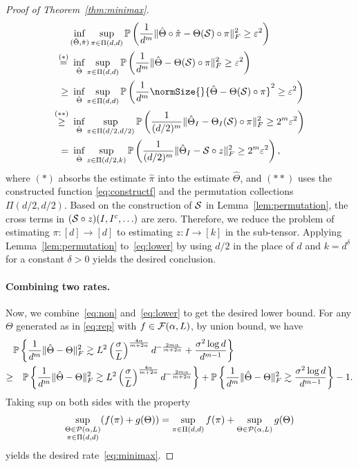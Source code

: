 \documentclass[12pt]{article}
\theoremstyle{definition}
\begin{document}
\begin{proof}[Proof of Theorem~\ref{thm:minimax}]
\begin{align}\label{eq:lower}
&\inf_{(\hat \Theta,\hat \pi)}\sup_{\pi\in \Pi(d,d)}\mathbb{P}\left({1\over d^m}\FnormSize{}{\hat \Theta\circ \hat \pi-\Theta(\tS)\circ \pi}^2\geq \varepsilon^2\right)\notag \\
\stackrel{(*)}{=}&\ \inf_{\hat \Theta}\sup_{\pi\in \Pi(d,d)}\mathbb{P}\left({1\over d^m}\FnormSize{}{\hat \Theta-\Theta(\tS)\circ \pi}^2\geq \varepsilon^2\right)\notag \\
\geq &\ \inf_{\hat \Theta}\sup_{\pi\in \Pi(d,d)}\mathbb{P}\left({1\over d^m}\normSize{}{\hat \Theta-\Theta(\tS)\circ \pi}^2\geq \varepsilon^2\right)\notag \\
\stackrel{(**)}{\geq}& \ \inf_{\hat  \Theta}\sup_{\pi \in\Pi(d/2,d/2)}\mathbb{P}\left({1\over (d/2)^m}\FnormSize{}{\hat \Theta_{I}-\Theta_{I}(\tS)\circ \pi}^2\geq 2^m\varepsilon^2\right)\notag \\
= & \ \inf_{\hat  \Theta}\sup_{z\in \Pi(d/2,k)}\mathbb{P}\left({1\over (d/2)^m}\FnormSize{}{\hat \Theta_I-\tS\circ z}^2\geq 2^m\varepsilon^2\right),
\end{align}
where $(*)$ absorbs the estimate $\hat \pi$ into the estimate $\hat \Theta$, and $(**)$ uses the constructed function \eqref{eq:constructf} and the permutation collections $\Pi(d/2,d/2)$. Based on the construction of $\mathcal{S}$ in Lemma~\ref{lem:permutation}, the cross terms in $(\mathcal{S}\circ z) (I, I^c, \ldots)$ are zero. Therefore, we reduce the problem of estimating $\pi \colon [d]\to[d]$ to estimating $z: I\to[k]$ in the sub-tensor. Applying Lemma~\ref{lem:permutation} to~\eqref{eq:lower} by using $d/2$ in the place of $d$ and $k=d^{\delta} $ for a constant $\delta>0$ yields the desired conclusion. 



\paragraph{Combining two rates.} Now, we combine~\eqref{eq:non} and~\eqref{eq:lower} to get the desired lower bound. For any $\Theta$  generated as in  \eqref{eq:rep} with $f\in\mathcal{F}(\alpha,L)$, by union bound, we have
\begin{align}
&\mathbb{P}\left\{ {1\over d^m}\lVert\hat \Theta- \Theta\rVert_F^2\gtrsim L^2\left(\sigma\over L\right)^{4\alpha\over m+2\alpha}d^{-{2m\alpha\over m+2\alpha}}+\frac{\sigma^2\log d}{d^{m-1}}\right\}\\
\geq &\quad \mathbb{P}\left\{ {1\over d^m}\lVert\hat \Theta-\Theta\rVert_F^2\gtrsim L^2\left(\sigma\over L\right)^{4\alpha\over m+2\alpha}d^{-{2m\alpha\over m+2\alpha}}\right\} +\mathbb{P}\left\{ {1\over d^m}\lVert\hat \Theta- \Theta\rVert_F^2\gtrsim \frac{\sigma^2\log d}{d^{m-1}}\right\}-1.
\end{align}
Taking sup on both sides with the property
\[
\sup_{\substack{\Theta\in \mathcal{P}(\alpha,L)\\\pi\in \Pi(d,d)}}(f(\pi)+g(\Theta))=\sup_{\pi\in \Pi(d,d)}f(\pi)+\sup_{\Theta\in \mathcal{P}(\alpha,L)}g(\Theta)
\]
yields the desired rate~\eqref{eq:minimax}. 
\end{proof}
\end{document}
